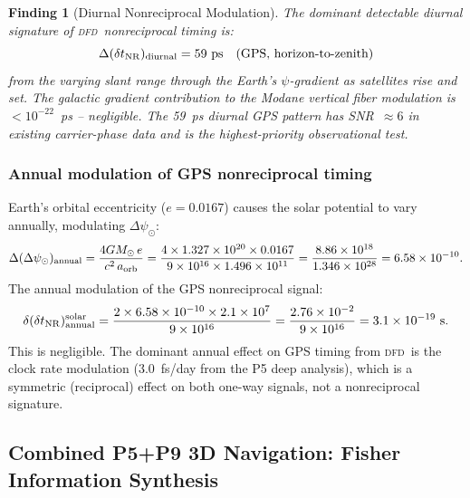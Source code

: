 \documentclass[aps,prd,twocolumn,superscriptaddress,nofootinbib,longbibliography]{revtex4-2}
\newcommand{\DFD}{\textsc{dfd}}
\newtheorem{finding}{Finding}
\begin{document}
\begin{finding}[Diurnal Nonreciprocal Modulation]
The dominant detectable diurnal signature of \DFD\ nonreciprocal timing is:
\begin{equation}
\Delta(\delta t_{\rm NR})_{\rm diurnal} = 59\ \si{ps}\quad(\text{GPS, horizon-to-zenith})
\end{equation}
from the varying slant range through the Earth's $\psi$-gradient as
satellites rise and set.  The galactic gradient contribution to
the Modane vertical fiber modulation is $<10^{-22}$~ps -- negligible.
The 59~ps diurnal GPS pattern has SNR~$\approx 6$ in existing
carrier-phase data and is the highest-priority observational test.
\end{finding}

\subsubsection{Annual modulation of GPS nonreciprocal timing}
\label{sec:annual-GPS}

Earth's orbital eccentricity ($e = 0.0167$) causes the solar
potential to vary annually, modulating $\Delta\psi_\odot$:
\begin{equation}
\Delta(\Delta\psi_\odot)_{\rm annual} = \frac{4GM_\odot\,e}{c^2\,a_{\rm orb}}
= \frac{4\times1.327\times10^{20}\times0.0167}{9\times10^{16}\times1.496\times10^{11}}
= \frac{8.86\times10^{18}}{1.346\times10^{28}} = 6.58\times10^{-10}.
\end{equation}
The annual modulation of the GPS nonreciprocal signal:
\begin{equation}
\delta(\delta t_{\rm NR})_{\rm annual}^{\rm solar}
= \frac{2\times6.58\times10^{-10}\times2.1\times10^7}{9\times10^{16}}
= \frac{2.76\times10^{-2}}{9\times10^{16}} = 3.1\times10^{-19}\ \si{s}.
\end{equation}
This is negligible.  The dominant annual effect on GPS timing from
\DFD\ is the clock rate modulation (3.0~fs/day from the P5 deep
analysis), which is a symmetric (reciprocal) effect on both one-way
signals, not a nonreciprocal signature.

\subsection{Combined P5+P9 3D Navigation: Fisher Information Synthesis}
\label{sec:combined-fisher}
\end{document}
